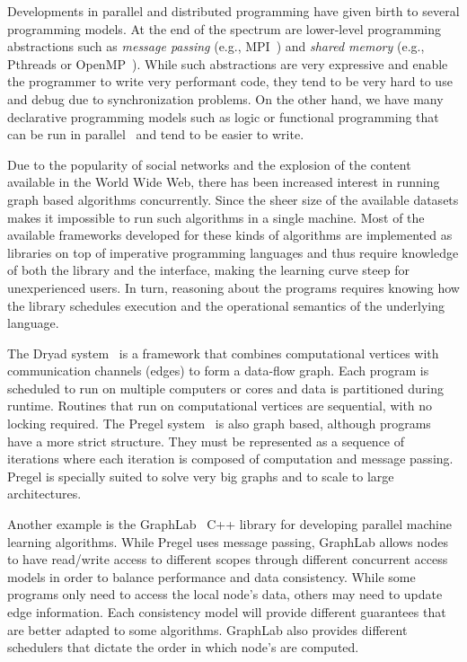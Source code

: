 
Developments in parallel and distributed programming have given birth to several programming models.
At the end of the spectrum are lower-level programming abstractions such as
\emph{message passing} (e.g., MPI~\cite{gabriel04-open-mpi}) and \emph{shared memory}
(e.g., Pthreads or OpenMP~\cite{Chapman-2007-UOP-1370966}).
While such abstractions are very expressive and enable the programmer to write very performant code,
they tend to be very hard to use and debug due to synchronization problems.
On the other hand, we have many declarative programming models such as logic or functional programming
that can be run in parallel~\cite{Gupta:2001:PEP:504083.504085,Blelloch:1996:PPA:227234.227246} and tend to be easier to write.

Due to the popularity of social networks and the explosion of the content available in the World Wide Web, there has been
increased interest in running graph based algorithms concurrently. Since the sheer size of
the available datasets makes it impossible to run such algorithms in a single machine.
Most of the available frameworks developed for these kinds of algorithms are implemented as libraries on top
of imperative programming languages and thus require knowledge of both the library and the interface, making
the learning curve steep for unexperienced users. In turn, reasoning about the programs requires knowing how
the library schedules execution and the operational semantics of the underlying language.

The Dryad system~\cite{Isard:2007:DDD:1272996.1273005} is a framework that combines computational vertices
with communication channels (edges) to form a data-flow graph. Each program is scheduled to
run on multiple computers or cores and data is partitioned during runtime. Routines that run on computational vertices
are sequential, with no locking required.
The Pregel system~\cite{Malewicz:2010:PSL:1807167.1807184} is also graph based, although programs have a more strict
structure. They must be represented as a sequence of iterations where each iteration is composed of computation and message passing.
Pregel is specially suited to solve very big graphs
and to scale to large architectures.

Another example is the GraphLab~\cite{GraphLab2010} C++ library for developing parallel machine learning algorithms. While
Pregel uses message passing, GraphLab allows nodes to have read/write access to different scopes through different concurrent access models in order to balance performance and data consistency. While some programs only need to access the local node's data, others may need to update edge information. Each consistency model will provide different guarantees that are better adapted to some algorithms. GraphLab also provides different schedulers that dictate the order in which node's are computed.

